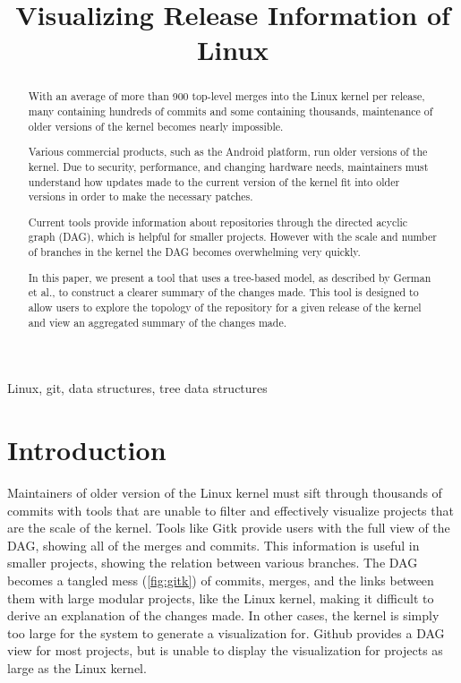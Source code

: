\documentclass[conference, draftclsnofoot]{IEEEtran}
\makeatletter
\newcommand{\TheTitle}{Visualizing Release Information of Linux}
\newcommand{\TheAuthors}{Evan Wilde}
\newcommand{\TheEmails}{etcwilde@uvic.ca}
\newcommand{\TheKeywords}{Linux, git, data structures, tree data structures}
\makeatother
\begin{document}
\title{\TheTitle}
\author{
\IEEEauthorblockA{\TheAuthors}
\IEEEauthorblockA{Email: \TheEmails}
}
\maketitle
\begin{abstract}

        With an average of more than 900 top-level merges into the Linux kernel per
        release, many containing hundreds of commits and some containing thousands,
        maintenance of older versions of the kernel becomes nearly impossible.

        Various commercial products, such as the Android platform, run older
        versions of the kernel. Due to security, performance, and changing hardware
        needs, maintainers must understand how updates made to the current version
        of the kernel fit into older versions in order to make the necessary
        patches.

        Current tools provide information about repositories through the directed
        acyclic graph (DAG), which is helpful for smaller projects. However with the
        scale and number of branches in the kernel the DAG becomes overwhelming very
        quickly.

        In this paper, we present a tool that uses a tree-based model, as described
        by German et al., to construct a clearer summary of the changes made. This
        tool is designed to allow users to explore the topology of the repository
        for a given release of the kernel and view an aggregated summary of the
        changes made.

\end{abstract}

\begin{IEEEkeywords}
\TheKeywords
\end{IEEEkeywords}

\section{Introduction}

Maintainers of older version of the Linux kernel must sift through thousands of
commits with tools that are unable to filter and effectively visualize projects that
are the scale of the kernel. Tools like Gitk provide users with the full view of the
DAG, showing all of the merges and commits. This information is useful in smaller
projects, showing the relation between various branches. The DAG becomes a tangled
mess (\ref{fig:gitk}) of commits, merges, and the links between them with large
modular projects, like the Linux kernel, making it difficult to derive an
explanation of the changes made. In other cases, the kernel is simply too large for
the system to generate a visualization for. Github provides a DAG view for most
projects, but is unable to display the visualization for projects as large as the
Linux kernel.
\end{document}

